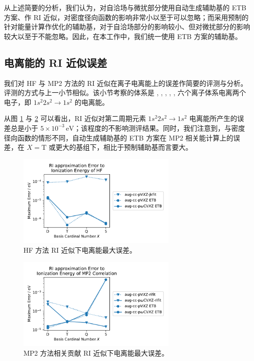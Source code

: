 从上述简要的分析，我们认为，对自洽场与微扰部分使用自动生成辅助基的 ETB 方案、作 RI 近似，对密度径向函数的影响非常小以至于可以忽略；而采用预制的针对能量计算作优化的辅助基，对于自洽场部分的影响较小、但对微扰部分的影响较大以至于不能忽略。因此，在本工作中，我们统一使用 ETB 方案的辅助基。

\subsection{电离能的 RI 近似误差}

我们对 HF 与 MP2 方法的 RI 近似在离子电离能上的误差作简要的评测与分析。评测的方式与上一小节相似。该小节考察的体系是 , , , , ,  六个离子体系电离两个电子，即 $1s^2 2s^2 \rightarrow 1s^2$ 的电离能。

从图 \ref{fig.4.HF-RI-eng} 与 \ref{fig.4.MP2-RI-eng} 可以看出，RI 近似对第二周期元素 $1s^2 2s^2 \rightarrow 1s^2$ 电离能所产生的误差总是小于 $5 \times 10^{-3} \, \text{eV}$；该程度的不影响测评结果。同时，我们注意到，与密度径向函数的情形不同，自动生成辅助基的 ETB 方案在 MP2 相关能计算上的误差，在 $X=\mathrm{T}$ 或更大的基组下，相比于预制辅助基而言要大。

\begin{figure}[t]
    \centering
    \includegraphics[width=0.7\textwidth]{assets/HF-RI-eng.pdf}
    \caption[HF 方法 RI 近似下电离能最大误差]{HF 方法 RI 近似下电离能最大误差。}
    \label{fig.4.HF-RI-eng}
\end{figure}

\begin{figure}[t]
    \centering
    \includegraphics[width=0.7\textwidth]{assets/MP2-RI-eng.pdf}
    \caption[MP2 方法相关贡献 RI 近似下电离能最大误差]{MP2 方法相关贡献 RI 近似下电离能最大误差。}
    \label{fig.4.MP2-RI-eng}
\end{figure}

